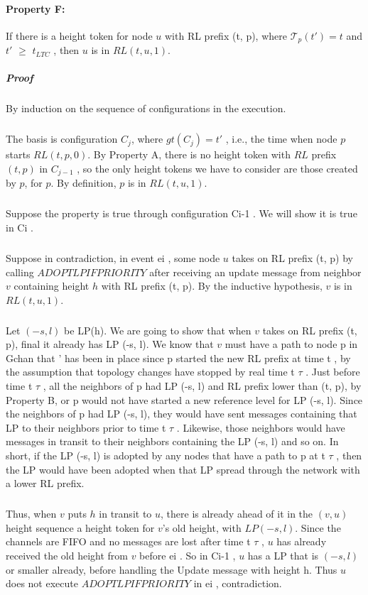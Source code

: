 \paragraph{Property F:} If there is a height token for node $u$ with RL prefix (t, p), where $\mathcal{T}_p(t') = t$ and $t'$ $\geq$ $t_{LTC}$ , then $u$ is in $RL (t, u, 1)$.
\subparagraph{Proof} By induction on the sequence of configurations in the execution.
\subparagraph{}The basis is configuration $C_j$, where $gt(C_j ) = t '$ , i.e., the time when node $p$ starts $RL (t, p, 0)$. By Property A, there is no height token with $RL$ prefix $(t, p)$ in $C_{j-1}$ , so the only height tokens we have to consider are those created by $p$, for $p$. By definition, $p$ is in $RL (t, u, 1)$.
\subparagraph{}Suppose the property is true through configuration Ci-1 . We will show it is true in Ci .
\subparagraph{}Suppose in contradiction, in event ei , some node $u$ takes on RL prefix (t, p) by calling $ADOPTLPIFPRIORITY$ after receiving an update message from neighbor $v$ containing height $h$ with RL prefix (t, p). By the inductive hypothesis, $v$ is in $RL (t, u, 1)$.
\subparagraph{}Let $(-s, l)$ be LP(h). We are going to show that when $v$ takes on RL prefix (t, p), final it already has LP (-s, l). We know that $v$ must have a path to node p in Gchan that ' has been in place since p started the new RL prefix at time t , by the assumption that topology changes have stopped by real time t $\tau$ . Just before time t $\tau$ , all the neighbors of p had LP (-s, l) and RL prefix lower than (t, p), by Property B, or p would not have started a new reference level for LP (-s, l). Since the neighbors of p had LP (-s, l), they would have sent messages containing that LP to their neighbors prior to time t $\tau$ . Likewise, those neighbors would have messages in transit to their neighbors containing the LP (-s, l) and so on. In short, if the LP (-s, l) is adopted by any nodes that have a path to p at t $\tau$ , then the LP would have been adopted when that LP spread through the network with a lower RL prefix. 
\subparagraph{}Thus, when $v$ puts $h$ in transit to $u$, there is already ahead of it in the $(v, u)$ height sequence a height token for $v$'s old height, with $LP (-s, l)$. Since the channels are FIFO and no messages are lost after time t $\tau$ , $u$ has already received the old height from $v$ before ei . So in Ci-1 , $u$ has a LP that is $(-s, l)$ or smaller already, before handling the Update message with height h. Thus $u$ does not execute $ADOPTLPIFPRIORITY$ in ei , contradiction.
